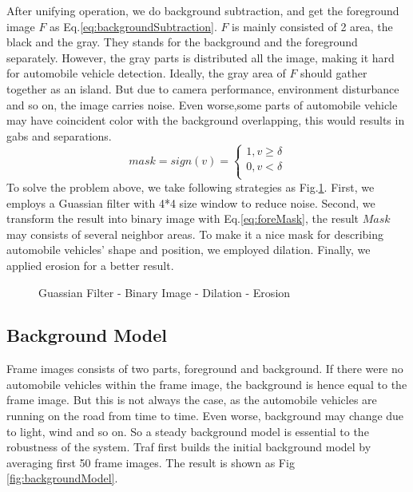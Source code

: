 \documentclass[draftclsnofoot,onecolumn]{IEEEtran}
\begin{document}
	After unifying operation, we do background subtraction, and get the foreground image $F$ as Eq.\ref{eq:backgroundSubtraction}. $F$ is mainly consisted of 2 area, the black and the gray. They stands for the background and the foreground separately. However, the gray parts is distributed all the image, making it hard for automobile vehicle detection. Ideally, the gray area of $F$ should gather together as an island. But due to camera performance, environment disturbance and so on, the image carries noise. Even worse,some parts of automobile vehicle may have coincident color with the background overlapping, this would results in gabs and separations.
	\begin{equation}
	  mask=sign(v)=\left\{
	   \begin{aligned}
	   	1, v \geq \delta \\
	   	0, v < \delta \\
	   \end{aligned}
	   \right.
	   \label{eq:foreMask}
	\end{equation}		
	To solve the problem above, we take following strategies as Fig.\ref{fig:preDetection}. First, we employs a Guassian filter with 4*4 size window to reduce noise. Second, we transform the result into binary image with Eq.\ref{eq:foreMask}, the result $Mask$ may consists of several neighbor areas. To make it a nice mask for describing automobile vehicles' shape and position, we employed dilation. Finally, we applied erosion for a better result. 
	
	\begin{figure}[!h]
	\centering
	\caption{Guassian Filter - Binary Image - Dilation - Erosion}
	\label{fig:preDetection}
	\end{figure}




	\subsection{Background Model}
	Frame images consists of two parts, foreground and background. If there were no automobile vehicles within the frame image, the background is hence equal to the frame image. But this is not always the case, as the automobile vehicles are running on the road from time to time. Even worse, background may change due to light, wind and so on. So a steady background model is essential to the robustness of the system.
	Traf first builds the initial background model by averaging first 50 frame images. The result is shown as Fig \ref{fig:backgroundModel}.
	 	
\end{document}
